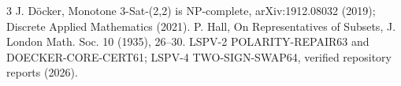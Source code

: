 \documentclass[11pt]{article}
\begin{document}
\begin{thebibliography}{3}
 J. D\"ocker, Monotone 3-Sat-(2,2) is NP-complete, arXiv:1912.08032 (2019); Discrete Applied Mathematics (2021).
 P. Hall, On Representatives of Subsets, J. London Math. Soc. 10 (1935), 26--30.
 LSPV-2 POLARITY-REPAIR63 and DOECKER-CORE-CERT61; LSPV-4 TWO-SIGN-SWAP64, verified repository reports (2026).
\end{thebibliography}
\end{document}
